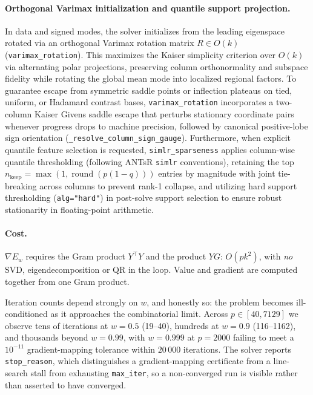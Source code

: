 \documentclass[11pt]{article}
\theoremstyle{definition}
\begin{document}
\paragraph{Orthogonal Varimax initialization and quantile support projection.}
In data and signed modes, the solver initializes from the leading eigenspace rotated via an orthogonal Varimax rotation matrix $R \in O(k)$ (\texttt{varimax\_rotation}). This maximizes the Kaiser simplicity criterion over $O(k)$ via alternating polar projections, preserving column orthonormality and subspace fidelity while rotating the global mean mode into localized regional factors. To guarantee escape from symmetric saddle points or inflection plateaus on tied, uniform, or Hadamard contrast bases, \texttt{varimax\_rotation} incorporates a two-column Kaiser Givens saddle escape that perturbs stationary coordinate pairs whenever progress drops to machine precision, followed by canonical positive-lobe sign orientation (\texttt{\_resolve\_column\_sign\_gauge}). Furthermore, when explicit quantile feature selection is requested, \texttt{simlr\_sparseness} applies column-wise quantile thresholding (following ANTsR \texttt{simlr} conventions), retaining the top $n_{\text{keep}} = \max(1, \operatorname{round}(p(1 - q)))$ entries by magnitude with joint tie-breaking across columns to prevent rank-1 collapse, and utilizing hard support thresholding (\texttt{alg="hard"}) in post-solve support selection to ensure robust stationarity in floating-point arithmetic.

\paragraph{Cost.} $\nabla E_w$ requires the Gram product $Y^\top Y$ and the
product $YG$: $O(pk^2)$, with \emph{no} SVD, eigendecomposition or QR in the
loop. Value and gradient are computed together from one Gram product.

Iteration counts depend strongly on $w$, and honestly so: the problem becomes
ill-conditioned as it approaches the combinatorial limit. Across
$p \in [40,7129]$ we observe tens of iterations at $w=0.5$ (19--40), hundreds at
$w=0.9$ (116--1162), and thousands beyond $w=0.99$, with $w=0.999$ at $p=2000$
failing to meet a $10^{-11}$ gradient-mapping tolerance within $20\,000$
iterations. The solver reports \texttt{stop\_reason}, which distinguishes a
gradient-mapping certificate from a line-search stall from exhausting
\texttt{max\_iter}, so a non-converged run is visible rather than asserted to
have converged.
\end{document}
